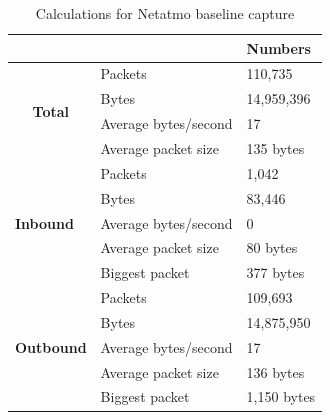 \begin{table}[H]
    \caption{Calculations for Netatmo baseline capture}
    \centering
    \begin{tabular}{ll|l|}
        \cline{3-3}                                               &                               &             \textbf{Numbers} \\ \hline
        \multicolumn{1}{|c|}{\multirow{4}{*}{\textbf{Total}}}    & Packets              & 110,735         \\ \cline{2-3} 
        \multicolumn{1}{|c|}{}                                   & Bytes                & 14,959,396       \\ \cline{2-3} 
        \multicolumn{1}{|c|}{}                                   & Average bytes/second & 17               \\ \cline{2-3} 
        \multicolumn{1}{|c|}{}                                   & Average packet size  & 135 bytes        \\ \hline
        \multicolumn{1}{|l|}{\multirow{5}{*}{\textbf{Inbound}}}  & Packets              & 1,042            \\ \cline{2-3} 
        \multicolumn{1}{|l|}{}                                   & Bytes                & 83,446           \\ \cline{2-3} 
        \multicolumn{1}{|l|}{}                                   & Average bytes/second & 0                \\ \cline{2-3} 
        \multicolumn{1}{|l|}{}                                   & Average packet size  & 80 bytes          \\ \cline{2-3} 
        \multicolumn{1}{|l|}{}                                   & Biggest packet       & 377 bytes        \\ \hline
        \multicolumn{1}{|l|}{\multirow{5}{*}{\textbf{Outbound}}} & Packets              & 109,693          \\ \cline{2-3} 
        \multicolumn{1}{|l|}{}                                   & Bytes                & 14,875,950       \\ \cline{2-3} 
        \multicolumn{1}{|l|}{}                                   & Average bytes/second & 17               \\ \cline{2-3} 
        \multicolumn{1}{|l|}{}                                   & Average packet size  & 136 bytes         \\ \cline{2-3} 
        \multicolumn{1}{|l|}{}                                   & Biggest packet       & 1,150 bytes       \\ \hline
    \end{tabular}
    \label{tab:NetatmoBaselineCalculations}
\end{table}
